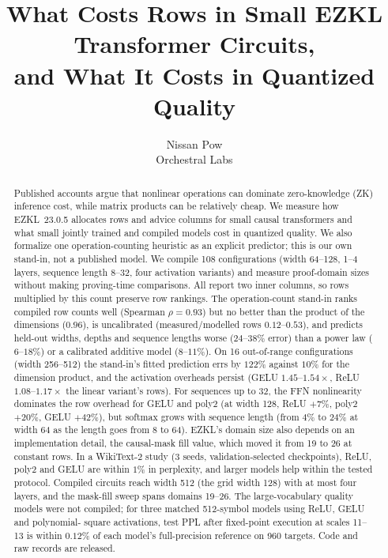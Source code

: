 \documentclass[10pt]{article}
\begin{document}
\title{What Costs Rows in Small EZKL Transformer Circuits,\\
       and What It Costs in Quantized Quality}

\author{%
  Nissan Pow\\
  Orchestral Labs
}

\maketitle

\begin{abstract}
Published accounts argue that nonlinear operations can dominate zero-knowledge
(ZK) inference cost, while matrix products can be relatively cheap. We measure
how EZKL~23.0.5 allocates rows and advice columns for small causal transformers
and what small jointly trained and compiled models cost in quantized
quality. We also formalize one operation-counting heuristic as an explicit
predictor; this is our own stand-in, not a published model. We compile 108
configurations (width
64--128, 1--4 layers, sequence length 8--32, four activation variants) and
measure proof-domain sizes without making proving-time comparisons. All report
two inner columns, so rows multiplied by this count preserve row rankings. The
operation-count stand-in ranks compiled row counts well
(Spearman $\rho{=}0.93$) but no better than the product of the dimensions ($0.96$),
is uncalibrated (measured/modelled rows $0.12$--$0.53$), and predicts held-out
widths, depths and sequence lengths worse ($24$--$38\%$ error) than a power law
($6$--$18\%$) or a calibrated additive model ($8$--$11\%$). On 16 out-of-range configurations (width 256--512) the stand-in's
fitted prediction errs by $122\%$ against $10\%$ for the dimension product, and
the activation overheads persist (GELU $1.45$--$1.54\times$, ReLU
$1.08$--$1.17\times$ the linear variant's rows). For
sequences up to 32, the FFN nonlinearity dominates the row overhead for GELU and poly2 (at width
128, ReLU $+7\%$, poly2 $+20\%$, GELU $+42\%$), but softmax grows with sequence length
(from $4\%$ to $24\%$ at width 64 as the length goes from 8 to 64). EZKL's domain
size also depends on an implementation detail, the causal-mask fill value, which
moved it from 19 to 26 at constant rows. In a WikiText-2 study (3 seeds,
validation-selected checkpoints), ReLU, poly2 and GELU are within $1\%$ in
perplexity, and larger models help within the tested protocol. Compiled circuits
reach width 512 (the grid width 128) with at most four layers, and the mask-fill
sweep spans domains 19--26. The large-vocabulary quality models were not
compiled; for three matched 512-symbol models using ReLU, GELU and polynomial-
square activations, test PPL after fixed-point execution at scales 11--13 is
within $0.12\%$ of each model's full-precision reference on 960 targets. Code
and raw records are released.
\end{abstract}
\end{document}
